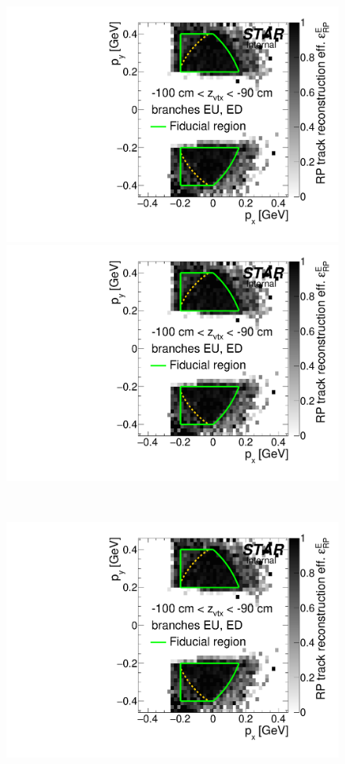 \begin{figure}[hb]\ContinuedFloat
\centering
\parbox{0.495\textwidth}{
  \centering
  \includegraphics[width=\linewidth,page=35]{graphics/corrections/mcFullEffPxPy.pdf}\\
  \includegraphics[width=\linewidth,page=37]{graphics/corrections/mcFullEffPxPy.pdf}
}~
\parbox{0.495\textwidth}{
  \centering
  \includegraphics[width=\linewidth,page=36]{graphics/corrections/mcFullEffPxPy.pdf}\\
}
\end{figure}

